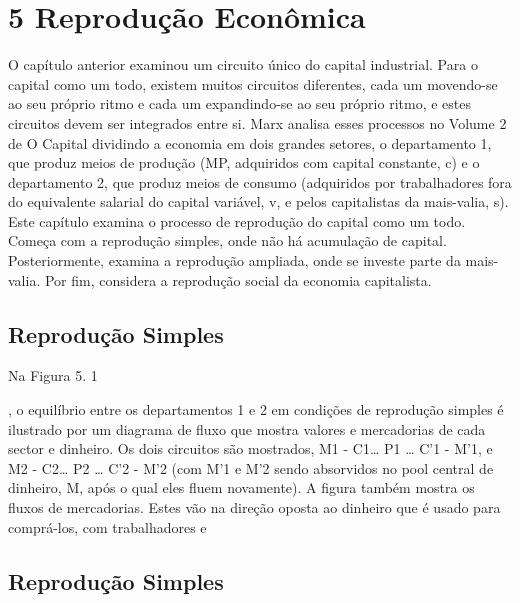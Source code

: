 \chapter{5 Reprodução Econômica}\label{5 Reprodução Econômica}
 \par 
O capítulo anterior examinou um circuito único do capital industrial. Para o capital como um todo, existem muitos circuitos diferentes, cada um movendo-se ao seu próprio ritmo e cada um expandindo-se ao seu próprio ritmo, e estes circuitos devem ser integrados entre si. Marx analisa esses processos no Volume {\color{blue}2} de O Capital dividindo a economia em dois grandes setores, o departamento 1, que produz meios de produção (MP, adquiridos com capital constante, c) e o departamento 2, que produz meios de consumo (adquiridos por trabalhadores fora do equivalente salarial do capital variável, v, e pelos capitalistas da mais-valia, s). Este capítulo examina o processo de reprodução do capital como um todo. Começa com a reprodução simples, onde não há acumulação de capital. Posteriormente, examina a reprodução ampliada, onde se investe parte da mais-valia. Por fim, considera a reprodução social da economia capitalista.
 \par 
\section{Reprodução Simples}
 \par 
Na Figura {\color{blue}5}. {\color{blue} 1 } {\par} , o equilíbrio entre os departamentos {\color{blue}1} e {\color{blue}2} em condições de reprodução simples é ilustrado por um diagrama de fluxo que mostra valores e mercadorias de cada sector e dinheiro. Os dois circuitos são mostrados, M1 - C1… P1 … C'1 - M'1, e M2 - C2… P2 … C'2 - M'2 (com M'1 e M'2 sendo absorvidos no pool central de dinheiro, M, após o qual eles fluem novamente). A figura também mostra os fluxos de mercadorias. Estes vão na direção oposta ao dinheiro que é usado para comprá-los, com trabalhadores e
 \par 
\section{Reprodução Simples}
 \par 
